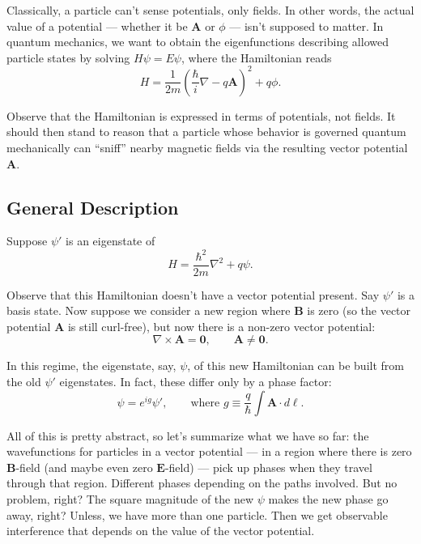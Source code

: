 \documentclass{article}
\begin{document}
Classically, a particle can't sense potentials, only fields. In other words, the actual value of a potential --- whether it be $\bm{A}$ or $\phi$ --- isn't supposed to matter. In quantum mechanics, we want to obtain the eigenfunctions describing allowed particle states by solving $H \psi = E \psi$, where the Hamiltonian reads
\begin{equation*}
    H = \frac{1}{2m} \left( \frac{\hbar}{i} \nabla - q \bm{A} \right)^2 + q\phi.
\end{equation*}

Observe that the Hamiltonian is expressed in terms of potentials, not fields. It should then stand to reason that a particle whose behavior is governed quantum mechanically can ``sniff'' nearby magnetic fields via the resulting vector potential $\bm{A}$.

\subsection{General Description}

Suppose $\psi'$ is an eigenstate of
\begin{equation*}
	H = \frac{\hbar^2}{2m} \nabla^2 + q\psi.
\end{equation*}

Observe that this Hamiltonian doesn't have a vector potential present. Say $\psi'$ is a basis state. Now suppose we consider a new region where $\bm{B}$ is zero (so the vector potential $\bm{A}$ is still curl-free), but now there is a non-zero vector potential:
\begin{equation*}
	\nabla \times \bm{A} = \bm{0}, \qquad \bm{A} \neq \bm{0}.
\end{equation*}

In this regime, the eigenstate, say, $\psi$, of this new Hamiltonian can be built from the old $\psi'$ eigenstates. In fact, these differ only by a phase factor:
\begin{equation*}
	\psi = e^{ig} \psi', \qquad \text{where } g \equiv \frac{q}{\hbar} \int \bm{A} \cdot d\bm{\ell}.
\end{equation*}

All of this is pretty abstract, so let's summarize what we have so far: the wavefunctions for particles in a vector potential --- in a region where there is zero $\bm{B}$-field (and maybe even zero $\bm{E}$-field) --- pick up phases when they travel through that region. Different phases depending on the paths involved. But no problem, right? The square magnitude of the new $\psi$ makes the new phase go away, right? Unless, we have more than one particle. Then we get observable interference that depends on the value of the vector potential.
\end{document}
